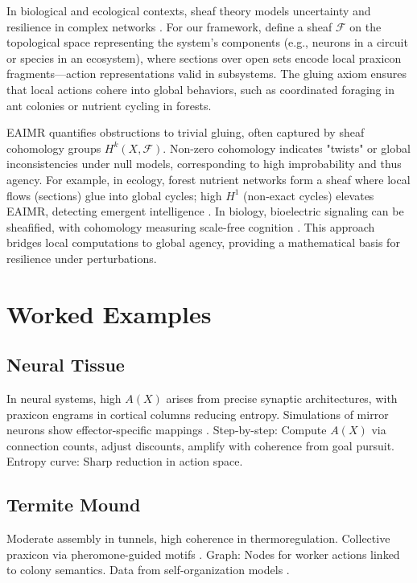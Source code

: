 \documentclass{article}
\begin{document}
In biological and ecological contexts, sheaf theory models uncertainty and resilience in complex networks \citep{stenzel2024}. For our framework, define a sheaf \(\mathcal{F}\) on the topological space representing the system's components (e.g., neurons in a circuit or species in an ecosystem), where sections over open sets encode local praxicon fragments—action representations valid in subsystems. The gluing axiom ensures that local actions cohere into global behaviors, such as coordinated foraging in ant colonies or nutrient cycling in forests.

EAIMR quantifies obstructions to trivial gluing, often captured by sheaf cohomology groups \(H^k(X, \mathcal{F})\). Non-zero cohomology indicates "twists" or global inconsistencies under null models, corresponding to high improbability and thus agency. For example, in ecology, forest nutrient networks form a sheaf where local flows (sections) glue into global cycles; high \(H^1\) (non-exact cycles) elevates EAIMR, detecting emergent intelligence \citep{levin2019}. In biology, bioelectric signaling can be sheafified, with cohomology measuring scale-free cognition \citep{levin2019, spivak2024}. This approach bridges local computations to global agency, providing a mathematical basis for resilience under perturbations.

\section{Worked Examples}
\label{sec:examples}

\subsection{Neural Tissue}
In neural systems, high \(A(X)\) arises from precise synaptic architectures, with praxicon engrams in cortical columns reducing entropy. Simulations of mirror neurons show effector-specific mappings \citep{vannuscorps2023}. Step-by-step: Compute \(A(X)\) via connection counts, adjust discounts, amplify with coherence from goal pursuit. Entropy curve: Sharp reduction in action space.

\subsection{Termite Mound}
Moderate assembly in tunnels, high coherence in thermoregulation. Collective praxicon via pheromone-guided motifs \citep{turner2000}. Graph: Nodes for worker actions linked to colony semantics. Data from self-organization models \citep{camazine2001}.
\end{document}
